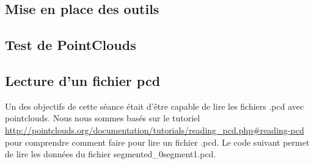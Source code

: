 \subsection{Mise en place des outils}

\subsection{Test de PointClouds}

\subsection{Lecture d'un fichier pcd}
	Un des objectifs de cette séance était d'être capable de lire les fichiers .pcd avec pointclouds. Nous nous sommes basés sur le tutoriel \url{http://pointclouds.org/documentation/tutorials/reading_pcd.php#reading-pcd} pour comprendre comment faire pour lire un fichier .pcd. Le code suivant permet de lire les données du fichier segmented\_0segment1.pcd.

	\inputminted[tabsize=4,linenos,fontsize=\small]{cpp}{../tests/lecture_data/pcd_read.cpp}

